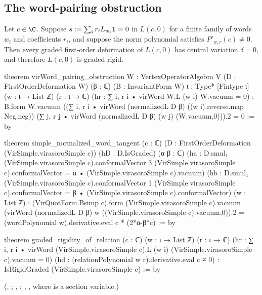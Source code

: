 \subsection{The word-pairing obstruction}

\begin{theorem}\label{l07:thm:relation}
Let $c\in\C$. Suppose $s := \sum_ir_iL_{w_i}\mathbf{1} = 0$ in $L(c,0)$ for a finite family of words $w_i$ and
coefficients $r_i$, and suppose the norm polynomial satisfies $P'_{w,r}(c)\ne0$. Then every graded
first-order deformation of $L(c,0)$ has central variation $\delta = 0$, and therefore
$L(c,0)$ is graded rigid.
\end{theorem}
\begin{leancode}
theorem virWord_pairing_obstruction {W : VertexOperatorAlgebra V}
    (D : FirstOrderDeformation W) (β : ℂ) (B : InvariantForm W)
    {ι : Type*} [Fintype ι] (w : ι → List ℤ) (r : ι → ℂ)
    (hr : ∑ i, r i • virWord W.L (w i) W.vacuum = 0) :
    B.form W.vacuum
      ((∑ i, r i • virWord (normalizedL D β) ((w i).reverse.map Neg.neg))
        (∑ j, r j • virWord (normalizedL D β) (w j) (W.vacuum,0))).2 = 0 := by

theorem simple_normalized_word_tangent (c : ℂ)
    (D : FirstOrderDeformation (VirSimple.virasoroSimple c)) (hD : D.IsGraded)
    (α β : ℂ)
    (ha : D.smul₁ (VirSimple.virasoroSimple c).conformalVector 3
      (VirSimple.virasoroSimple c).conformalVector = α • (VirSimple.virasoroSimple c).vacuum)
    (hb : D.smul₁ (VirSimple.virasoroSimple c).conformalVector 1
      (VirSimple.virasoroSimple c).conformalVector = β • (VirSimple.virasoroSimple c).conformalVector)
    (w : List ℤ) :
    (VirQuotForm.Bsimp c).form (VirSimple.virasoroSimple c).vacuum
      (virWord (normalizedL D β) w ((VirSimple.virasoroSimple c).vacuum,0)).2 =
        (wordPolynomial w).derivative.eval c * (2*α-β*c) := by

theorem graded_rigidity_of_relation (c : ℂ) (w : ι → List ℤ) (r : ι → ℂ)
    (hr : ∑ i, r i • virWord (VirSimple.virasoroSimple c).L (w i)
      (VirSimple.virasoroSimple c).vacuum = 0)
    (hd : (relationPolynomial w r).derivative.eval c ≠ 0) :
    IsRigidGraded (VirSimple.virasoroSimple c) := by
\end{leancode}
(, ;
,
;
,
, where  is a
section variable.)

